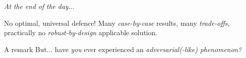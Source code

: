 \begin{frame}{ \textit{At the end of the day}...}

    No optimal, universal defence! Many \textit{case-by-case} results, many \textit{trade-offs}, practically no \textit{robust-by-design} applicable solution.
    \hfill\break

    \begin{block}{A remark}
        But... have \textit{\alert{you}} ever experienced an \textit{adversarial(-like) phenomenon?}
    \end{block}

\end{frame}
